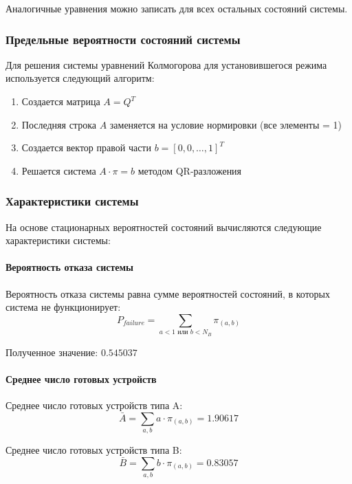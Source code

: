 Аналогичные уравнения можно записать для всех остальных состояний системы.

\subsubsection{Предельные вероятности состояний системы}

Для решения системы уравнений Колмогорова для установившегося режима используется следующий алгоритм:
\begin{enumerate}
    \item Создается матрица $A = Q^T$
    \item Последняя строка $A$ заменяется на условие нормировки (все элементы = 1)
    \item Создается вектор правой части $b = [0, 0, \ldots, 1]^T$
    \item Решается система $A \cdot \pi = b$ методом QR-разложения
\end{enumerate}

\subsubsection{Характеристики системы}

На основе стационарных вероятностей состояний вычисляются следующие характеристики системы:

\paragraph{Вероятность отказа системы}
Вероятность отказа системы равна сумме вероятностей состояний, в которых система не функционирует:
\begin{equation}
P_{failure} = \sum_{a < 1 \text{ или } b < N_B} \pi_{(a,b)}
\end{equation}

Полученное значение: $0.545037$

\paragraph{Среднее число готовых устройств}
Среднее число готовых устройств типа A:
\begin{equation}
\bar{A} = \sum_{a,b} a \cdot \pi_{(a,b)} = 1.90617
\end{equation}

Среднее число готовых устройств типа B:
\begin{equation}
\bar{B} = \sum_{a,b} b \cdot \pi_{(a,b)} = 0.83057
\end{equation}

